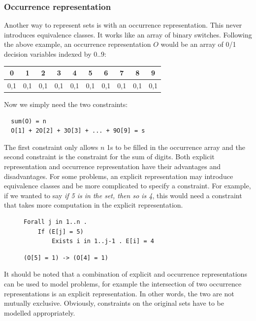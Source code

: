 \documentclass[CS4402-Notes.tex]{subfiles}
\begin{document}
\subsubsection{Occurrence representation}
Another way to represent sets is with an occurrence representation. This never introduces equivalence classes. It works like an array of binary switches. Following the above example, an occurrence representation $O$ would be an array of 0/1 decision variables indexed by $0..9$:
\begin{table}[H]
\centering
\begin{tabular}{| c | c | c | c | c | c | c | c | c | c |}
\hline
\textbf{0} & \textbf{1} & \textbf{2} & \textbf{3} & \textbf{4} & \textbf{5} & \textbf{6} & \textbf{7} & \textbf{8} & \textbf{9} \\
\hline
0,1 &  0,1 & 0,1 & 0,1 & 0,1 & 0,1 & 0,1 & 0,1 & 0,1 & 0,1 \\
\hline
\end{tabular}
\end{table}
Now we simply need the two constraints:
\begin{lstlisting}
  sum(O) = n
  O[1] + 2O[2] + 3O[3] + ... + 9O[9] = s
\end{lstlisting}
The first constraint only allows $n$ 1s to be filled in the occurrence array and the second constraint is the constraint for the sum of digits.
\n
Both explicit representation and occurrence representation have their advantages and disadvantages. For some problems, an explicit representation may introduce equivalence classes and be more complicated to specify a constraint. For example, if we wanted to say \textit{if 5 is in the set, then so is 4}, this would need a constraint that takes more computation in the explicit representation.
\begin{figure}[H]
\begin{minipage}{0.42\textwidth}
\begin{lstlisting}[caption={Explicit representation}]
Forall j in 1..n .
    If (E[j] = 5)
        Exists i in 1..j-1 . E[i] = 4
\end{lstlisting}
\end{minipage}
\hspace*{\fill}
\begin{minipage}{0.42\textwidth}
\begin{lstlisting}[caption={Occurrence representation}]
(O[5] = 1) -> (O[4] = 1)
\end{lstlisting}
\end{minipage}
\end{figure}
\noindent
It should be noted that a combination of explicit and occurrence representations can be used to model problems, for example the intersection of two occurrence representations is an explicit representation. In other words, the two are not mutually exclusive. Obviously, constraints on the original sets have to be modelled appropriately.
\end{document}
